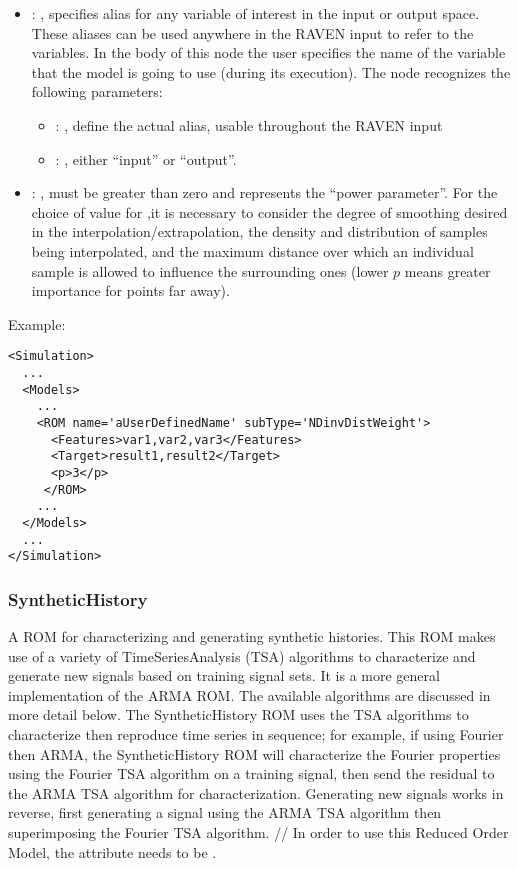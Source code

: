 \begin{itemize}
    \item {}: , 
      specifies alias for         any variable of interest in the input or output space. These
      aliases can be used anywhere in the RAVEN input to         refer to the variables. In the body
      of this node the user specifies the name of the variable that the model is going to use
      (during its execution).
      The  node recognizes the following parameters:
        \begin{itemize}
          \item {}: , 
            define the actual alias, usable throughout the RAVEN input
          \item {}: , 
            either ``input'' or ``output''.
      \end{itemize}

    \item {}: , 
      must be greater than zero and represents the ``power parameter''.
      For the choice of value for ,it is necessary to consider the degree
      of smoothing desired in the interpolation/extrapolation, the density and
      distribution of samples being interpolated, and the maximum distance over
      which an individual sample is allowed to influence the surrounding ones (lower
      $p$ means greater importance for points far away).
  \end{itemize}

\hspace{24pt}
Example:
\begin{lstlisting}[style=XML,morekeywords={name,subType}]
<Simulation>
  ...
  <Models>
    ...
    <ROM name='aUserDefinedName' subType='NDinvDistWeight'>
      <Features>var1,var2,var3</Features>
      <Target>result1,result2</Target>
      <p>3</p>
     </ROM>
    ...
  </Models>
  ...
</Simulation>
\end{lstlisting}


\subsubsection{SyntheticHistory}
  A ROM for characterizing and generating synthetic histories. This ROM makes use of         a
  variety of TimeSeriesAnalysis (TSA) algorithms to characterize and generate new         signals
  based on training signal sets. It is a more general implementation of the ARMA ROM. The available
  algorithms are discussed in more detail below. The SyntheticHistory ROM uses the TSA algorithms to
  characterize then reproduce time series in sequence; for example, if using Fourier then ARMA, the
  SyntheticHistory ROM will characterize the Fourier properties using the Fourier TSA algorithm on a
  training signal, then send the residual to the ARMA TSA algorithm for characterization. Generating
  new signals works in reverse, first generating a signal using the ARMA TSA algorithm then
  superimposing the Fourier TSA algorithm.         //         In order to use this Reduced Order
  Model, the  attribute          needs to be
  .


